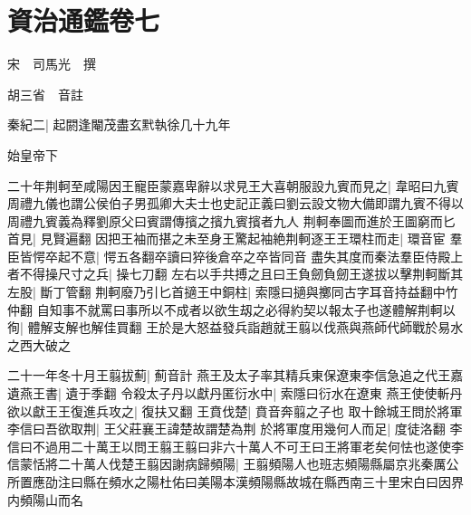 \chapter{資治通鑑卷七}
宋　司馬光　撰

胡三省　音註

秦紀二|{
	起閼逢閹茂盡玄黓執徐几十九年}


始皇帝下

二十年荆軻至咸陽因王寵臣蒙嘉卑辭以求見王大喜朝服設九賓而見之|{
	韋昭曰九賓周禮九儀也謂公侯伯子男孤卿大夫士也史記正義曰劉云設文物大備即謂九賓不得以周禮九賓義為釋劉原父曰賓謂傳擯之擯九賓擯者九人}
荆軻奉圖而進於王圖窮而匕首見|{
	見賢遍翻}
因把王袖而揕之未至身王驚起袖絶荆軻逐王王環柱而走|{
	環音宦}
羣臣皆愕卒起不意|{
	愕五各翻卒讀曰猝後倉卒之卒皆同音}
盡失其度而秦法羣臣侍殿上者不得操尺寸之兵|{
	操七刀翻}
左右以手共搏之且曰王負劒負劒王遂拔以擊荆軻斷其左股|{
	斷丁管翻}
荆軻廢乃引匕首擿王中銅柱|{
	索隱曰擿與擲同古字耳音持益翻中竹仲翻}
自知事不就罵曰事所以不成者以欲生刼之必得約契以報太子也遂體解荆軻以徇|{
	體解支解也解佳買翻}
王於是大怒益發兵詣趙就王翦以伐燕與燕師代師戰於易水之西大破之

二十一年冬十月王翦拔薊|{
	薊音計}
燕王及太子率其精兵東保遼東李信急追之代王嘉遺燕王書|{
	遺于季翻}
令殺太子丹以獻丹匿衍水中|{
	索隱曰衍水在遼東}
燕王使使斬丹欲以獻王王復進兵攻之|{
	復扶又翻}
王賁伐楚|{
	賁音奔翦之子也}
取十餘城王問於將軍李信曰吾欲取荆|{
	王父莊襄王諱楚故謂楚為荆}
於將軍度用幾何人而足|{
	度徒洛翻}
李信曰不過用二十萬王以問王翦王翦曰非六十萬人不可王曰王將軍老矣何怯也遂使李信蒙恬將二十萬人伐楚王翦因謝病歸頻陽|{
	王翦頻陽人也班志頻陽縣屬京兆秦厲公所置應劭注曰縣在頻水之陽杜佑曰美陽本漢頻陽縣故城在縣西南三十里宋白曰因界内頻陽山而名}



